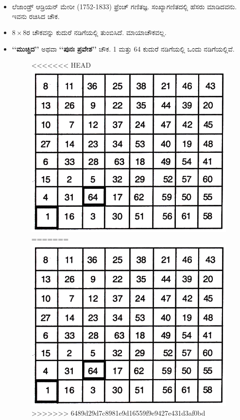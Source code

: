 \begin{itemize}
	\item ಲೆಜಾಂಡ್ರ್ ಆಡ್ರಿಯನ್ ಮೇರೀ (1752-1833) ಫ್ರೆಂಚ್ ಗಣಿತಜ್ಞ. ಸಂಖ್ಯಾಗಣಿತದಲ್ಲಿ ಹೆಸರು ಮಾಡಿದವನು. ಇವನು ರಚಿಸಿದ ಚೌಕ.
	\item $8 \times 8$ರ ಚೌಕವನ್ನು ಕುದುರೆ ನಡಿಗೆಯಲ್ಲಿ ತುಂಬಿಸಿದೆ. ಮಾಯಾಚೌಕವಲ್ಲ.
	\item \textbf{‘‘ಮುಚ್ಚಿದ’’} ಅಥವಾ  \textbf{‘‘ಪುನಃ ಪ್ರವೇಶ’’} ಚೌಕ. 1 ಮತ್ತು 64 ಕುದುರೆ ನಡಿಗೆಯಲ್ಲಿ ಒಂದು ನಡಿಗೆಯಲ್ಲಿವೆ.
	\begin{figure}[H]
<<<<<<< HEAD
	\includegraphics{src/figures/chap6/fig6-9.jpg}
=======
	\includegraphics[scale=0.8]{src/figures/chap6/fig6.9.jpg}
>>>>>>> 6489d29d7c8981e9d16559f9e9427e431d3af0bd
	\end{figure}
\end{itemize}

